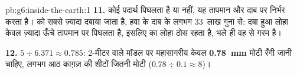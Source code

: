 \begin{solution}{pb:g6:inside-the-earth:1}
\textbf{11.} कोई पदार्थ पिघलता है या नहीं, यह तापमान और दाब पर निर्भर करता है।
 को सबसे ज़्यादा दबाया जाता है, हवा के दाब के लगभग
33~लाख गुना से: दबा हुआ लोहा केवल ज़्यादा ऊँचे तापमान पर पिघलता है, इसलिए
 का लोहा ठोस रहता है, भले ही वह
 से गरम है।

\textbf{12.} $5 \div 6.371 \approx 0.785$: 2-मीटर वाले मॉडल पर महासागरीय 
केवल \textbf{0.78~mm} मोटी रँगी जानी चाहिए, लगभग आठ काग़ज़ की शीटों
जितनी मोटी ($0.78 \div 0.1 \approx 8$)।
\end{solution}
